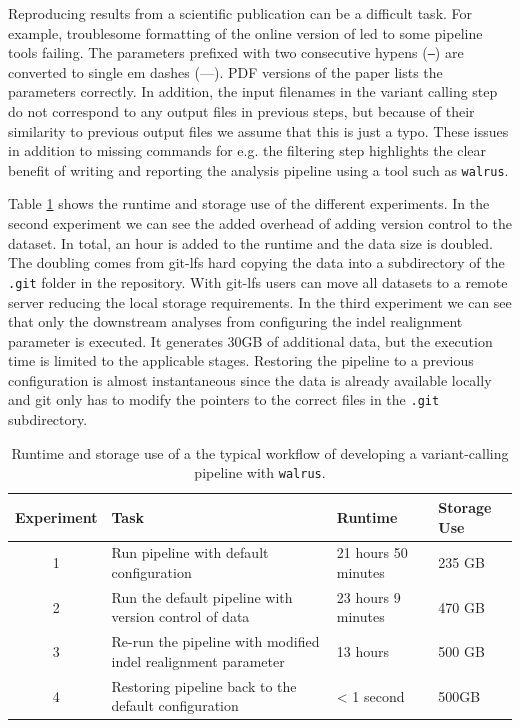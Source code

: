 Reproducing results from a scientific publication can be a difficult task. For
example, troublesome formatting of the online version of
\cite{cornish2015comparison} led to some pipeline tools failing. The parameters
prefixed with two consecutive hypens (\texttt{--}) are converted to single em
dashes (---).  PDF versions of the paper lists the parameters correctly.  In
addition, the input filenames in the variant calling step do not correspond to
any output files in previous steps, but because of their similarity to previous
output files we assume that this is just a typo. These issues in addition to
missing commands for e.g. the filtering step highlights the clear benefit of
writing and reporting the analysis pipeline using a tool such as
\texttt{walrus}. 

Table \ref{resultstable} shows the runtime and storage use of the different
experiments. In the second experiment we can see the added overhead of adding
version control to the dataset. In total, an hour is added to the runtime and
the data size is doubled. The doubling comes from git-lfs hard copying the data
into a subdirectory of the \texttt{.git} folder in the repository. With git-lfs
users can move all datasets to a remote server reducing the local storage
requirements. 
In the third experiment we can see that only the downstream analyses from
configuring the indel realignment parameter is executed. It generates 30GB of
additional data, but the execution time is limited to the applicable stages.
Restoring the pipeline to a previous configuration is almost instantaneous since
the data is already available locally and git only has to modify the pointers to
the correct files in the \texttt{.git} subdirectory. 

\begin{table}[ht!]
    \centering
    \caption{Runtime and storage use of a the typical workflow of developing a
    variant-calling pipeline with \texttt{walrus}.} 
    \begin{tabular}{ | c | p{2.5cm} | p{2cm} | p{1cm} |}
    \hline
    Experiment & Task & Runtime & Storage Use \\ \hline
    1 & Run pipeline with default configuration & 21 hours 50 minutes & 235 GB
        \\ \hline
    2 & Run the default pipeline with version control of data & 23 hours 9
        minutes & 470 GB \\ \hline
    3 & Re-run the pipeline with modified indel realignment parameter & 13 hours
        & 500 GB \\ \hline
    4 & Restoring pipeline back to the default configuration & < 1 second &
        500GB \\ \hline
    \end{tabular}
    \label{resultstable}
\end{table}


